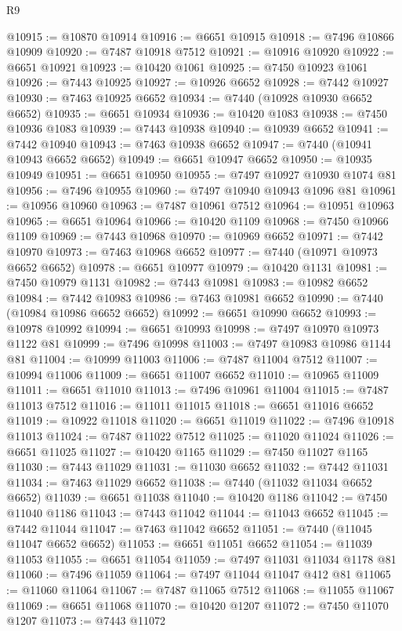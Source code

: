 \begin{lexlean}{R9}
\begin{coremodule}
{{{{{{{{{{{{{{{{{{{{{{{{{{{{{{{{{{{{{{{{{{{{{{{{{{{{{{{{{{{{{{{{{{{{{{{{{{{{{{{{{{{{@10915 := @10870 @10914
@10916 := @6651 @10915
@10918 := @7496 @10866 @10909
@10920 := @7487 @10918 @7512
@10921 := @10916 @10920
@10922 := @6651 @10921
@10923 := @10420 @1061
@10925 := @7450 @10923 @1061
@10926 := @7443 @10925
@10927 := @10926 @6652
@10928 := @7442 @10927
@10930 := @7463 @10925 @6652
@10934 := @7440 (@10928 @10930 @6652 @6652)
@10935 := @6651 @10934
@10936 := @10420 @1083
@10938 := @7450 @10936 @1083
@10939 := @7443 @10938
@10940 := @10939 @6652
@10941 := @7442 @10940
@10943 := @7463 @10938 @6652
@10947 := @7440 (@10941 @10943 @6652 @6652)
@10949 := @6651 @10947 @6652
@10950 := @10935 @10949
@10951 := @6651 @10950
@10955 := @7497 @10927 @10930 @1074 @81
@10956 := @7496 @10955
@10960 := @7497 @10940 @10943 @1096 @81
@10961 := @10956 @10960
@10963 := @7487 @10961 @7512
@10964 := @10951 @10963
@10965 := @6651 @10964
@10966 := @10420 @1109
@10968 := @7450 @10966 @1109
@10969 := @7443 @10968
@10970 := @10969 @6652
@10971 := @7442 @10970
@10973 := @7463 @10968 @6652
@10977 := @7440 (@10971 @10973 @6652 @6652)
@10978 := @6651 @10977
@10979 := @10420 @1131
@10981 := @7450 @10979 @1131
@10982 := @7443 @10981
@10983 := @10982 @6652
@10984 := @7442 @10983
@10986 := @7463 @10981 @6652
@10990 := @7440 (@10984 @10986 @6652 @6652)
@10992 := @6651 @10990 @6652
@10993 := @10978 @10992
@10994 := @6651 @10993
@10998 := @7497 @10970 @10973 @1122 @81
@10999 := @7496 @10998
@11003 := @7497 @10983 @10986 @1144 @81
@11004 := @10999 @11003
@11006 := @7487 @11004 @7512
@11007 := @10994 @11006
@11009 := @6651 @11007 @6652
@11010 := @10965 @11009
@11011 := @6651 @11010
@11013 := @7496 @10961 @11004
@11015 := @7487 @11013 @7512
@11016 := @11011 @11015
@11018 := @6651 @11016 @6652
@11019 := @10922 @11018
@11020 := @6651 @11019
@11022 := @7496 @10918 @11013
@11024 := @7487 @11022 @7512
@11025 := @11020 @11024
@11026 := @6651 @11025
@11027 := @10420 @1165
@11029 := @7450 @11027 @1165
@11030 := @7443 @11029
@11031 := @11030 @6652
@11032 := @7442 @11031
@11034 := @7463 @11029 @6652
@11038 := @7440 (@11032 @11034 @6652 @6652)
@11039 := @6651 @11038
@11040 := @10420 @1186
@11042 := @7450 @11040 @1186
@11043 := @7443 @11042
@11044 := @11043 @6652
@11045 := @7442 @11044
@11047 := @7463 @11042 @6652
@11051 := @7440 (@11045 @11047 @6652 @6652)
@11053 := @6651 @11051 @6652
@11054 := @11039 @11053
@11055 := @6651 @11054
@11059 := @7497 @11031 @11034 @1178 @81
@11060 := @7496 @11059
@11064 := @7497 @11044 @11047 @412 @81
@11065 := @11060 @11064
@11067 := @7487 @11065 @7512
@11068 := @11055 @11067
@11069 := @6651 @11068
@11070 := @10420 @1207
@11072 := @7450 @11070 @1207
@11073 := @7443 @11072
}}}}}}}}}}}}}}}}}}}}}}}}}}}}}}}}}}}}}}}}}}}}}}}}}}}}}}}}}}}}}}}}}}}}}}}}}}}}}}}}}}}}
\end{coremodule}
\end{lexlean}
